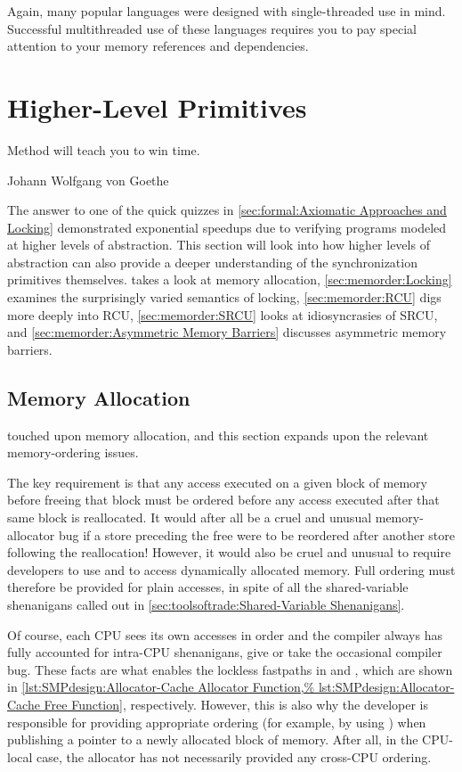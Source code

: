 Again, many popular languages were designed with single-threaded use
in mind.
Successful multithreaded use of these languages requires you to pay
special attention to your memory references and dependencies.

\section{Higher-Level Primitives}
\label{sec:memorder:Higher-Level Primitives}
%
\epigraph{Method will teach you to win time.}
	 {Johann Wolfgang von Goethe}

The answer to one of the quick quizzes in
\cref{sec:formal:Axiomatic Approaches and Locking}
demonstrated exponential speedups due to verifying programs
modeled at higher levels of abstraction.
This section will look into how higher levels of abstraction can
also provide a deeper understanding of the synchronization primitives
themselves.
takes a look at memory allocation,
\cref{sec:memorder:Locking}
examines the surprisingly varied semantics of locking,
\cref{sec:memorder:RCU}
digs more deeply into RCU,
\cref{sec:memorder:SRCU}
looks at idiosyncrasies of SRCU, and
\cref{sec:memorder:Asymmetric Memory Barriers}
discusses asymmetric memory barriers.

\subsection{Memory Allocation}
\label{sec:memorder:Memory Allocation}

touched upon memory allocation, and this section expands upon the relevant
memory-ordering issues.

The key requirement is that any access executed on a given block of
memory before freeing that block must be ordered before any access
executed after that same block is reallocated.
It would after all be a cruel and unusual memory-allocator bug if a store
preceding the free were to be reordered after another store following
the reallocation!
However, it would also be cruel and unusual to require developers to use
 and  to access dynamically allocated
memory.
Full ordering must therefore be provided for plain accesses, in spite of
all the shared-variable shenanigans called out in
\cref{sec:toolsoftrade:Shared-Variable Shenanigans}.

Of course, each CPU sees its own accesses in order and the compiler
always has fully accounted for intra-CPU shenanigans, give or take
the occasional compiler bug.
These facts are what enables the lockless fastpaths in
 and , which are shown in
\cref{lst:SMPdesign:Allocator-Cache Allocator Function,%
lst:SMPdesign:Allocator-Cache Free Function},
respectively.
However, this is also why the developer is responsible for providing
appropriate ordering (for example, by using )
when publishing a pointer to a newly allocated block of memory.
After all, in the CPU-local case, the allocator has not necessarily
provided any cross-CPU ordering.

